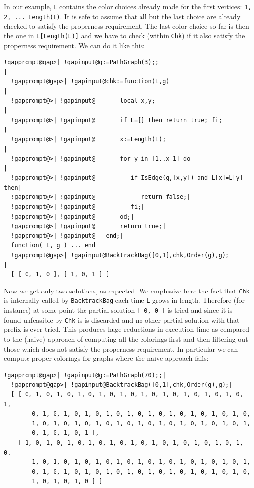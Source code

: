 \documentclass[a4paper,11pt]{report}
\begin{document}
{{In our example, \texttt{L} contains the color choices already made for the first vertices: \texttt{1, 2, ... Length(L)}. It is safe to assume that all but the last choice are already checked to
satisfy the properness requirement. The last color choice so far is then the
one in \texttt{L[Length(L)]} and we have to check (within \texttt{Chk}) if it also satisfy the properness requirement. We can do it like this: 

 
\begin{Verbatim}[commandchars=!@|,fontsize=\small,frame=single,label=Example]
  !gapprompt@gap>| !gapinput@g:=PathGraph(3);;                                    |
  !gapprompt@gap>| !gapinput@chk:=function(L,g)                                   |
  !gapprompt@>| !gapinput@       local x,y;                                           |
  !gapprompt@>| !gapinput@       if L=[] then return true; fi;                        |
  !gapprompt@>| !gapinput@       x:=Length(L);                                        |
  !gapprompt@>| !gapinput@       for y in [1..x-1] do                                 |
  !gapprompt@>| !gapinput@          if IsEdge(g,[x,y]) and L[x]=L[y] then|
  !gapprompt@>| !gapinput@             return false;|
  !gapprompt@>| !gapinput@          fi;|
  !gapprompt@>| !gapinput@       od;|
  !gapprompt@>| !gapinput@       return true;|
  !gapprompt@>| !gapinput@   end;|
  function( L, g ) ... end
  !gapprompt@gap>| !gapinput@BacktrackBag([0,1],chk,Order(g),g);                     |
  [ [ 0, 1, 0 ], [ 1, 0, 1 ] ]
\end{Verbatim}
 

Now we get only two solutions, as expected. We emphasize here the fact that \texttt{Chk} is internally called by \texttt{BacktrackBag} each time \texttt{L} grows in length. Therefore (for instance) at some point the partial solution \texttt{[ 0, 0 ]} is tried and since it is found unfeasible by \texttt{Chk} is is discarded and no other partial solution with that prefix is ever tried.
This produces huge reductions in execution time as compared to the (naive)
approach of computing all the colorings first and then filtering out those
which does not satisfy the properness requirement. In particular we can
compute proper colorings for graphs where the naive approach fails: 

 
\begin{Verbatim}[commandchars=!@|,fontsize=\small,frame=single,label=Example]
  !gapprompt@gap>| !gapinput@g:=PathGraph(70);;|
  !gapprompt@gap>| !gapinput@BacktrackBag([0,1],chk,Order(g),g);|
  [ [ 0, 1, 0, 1, 0, 1, 0, 1, 0, 1, 0, 1, 0, 1, 0, 1, 0, 1, 0, 1, 0, 1, 
        0, 1, 0, 1, 0, 1, 0, 1, 0, 1, 0, 1, 0, 1, 0, 1, 0, 1, 0, 1, 0, 
        1, 0, 1, 0, 1, 0, 1, 0, 1, 0, 1, 0, 1, 0, 1, 0, 1, 0, 1, 0, 1, 
        0, 1, 0, 1, 0, 1 ], 
    [ 1, 0, 1, 0, 1, 0, 1, 0, 1, 0, 1, 0, 1, 0, 1, 0, 1, 0, 1, 0, 1, 0, 
        1, 0, 1, 0, 1, 0, 1, 0, 1, 0, 1, 0, 1, 0, 1, 0, 1, 0, 1, 0, 1, 
        0, 1, 0, 1, 0, 1, 0, 1, 0, 1, 0, 1, 0, 1, 0, 1, 0, 1, 0, 1, 0, 
        1, 0, 1, 0, 1, 0 ] ]
\end{Verbatim}
 

}}
\end{document}
